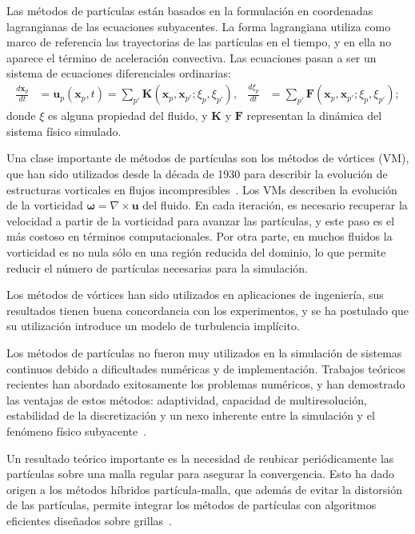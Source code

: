 \documentclass[11pt,spanish]{article}
\newcommand{\vel}{\mathbf{u}}
\newcommand{\vort}{\mathbf{\omega}}
\newcommand{\pos}{\mathbf{x}}
\begin{document}
Las métodos de partículas están basados en la formulación en coordenadas
lagrangianas de las ecuaciones subyacentes.  La forma lagrangiana utiliza como
marco de referencia las trayectorias de las partículas en el tiempo, y en ella
no aparece el término de aceleración convectiva.  Las ecuaciones pasan a ser un
sistema de ecuaciones diferenciales ordinarias:
\begin{align}
    \frac{d\pos_p}{dt} &= \vel_p(\pos_p, t) =
        \sum_{p'} \mathbf{K}(\pos_p, \pos_{p'}; \xi_p, \xi_{p'}), &
    \frac{d\xi_p}{dt} &=
        \sum_{p'} \mathbf{F}(\pos_p, \pos_{p'}; \xi_p, \xi_{p'});
\end{align}
donde $\xi$ es alguna propiedad del fluido, y $\mathbf{K}$ y $\mathbf{F}$ 
representan la dinámica del sistema físico simulado.

Una clase importante de métodos de partículas son los métodos de vórtices (VM),
que han sido utilizados desde la década de 1930 para describir la evolución de
estructuras vorticales en flujos incompresibles~\cite[\S2.2]{multiscale}.  Los
VMs describen la evolución de la vorticidad $\vort = \nabla\times\vel$ del
fluido.  En cada iteración, es necesario recuperar la velocidad a partir de la
vorticidad para avanzar las partículas, y este paso es el más costoso en
términos computacionales.  Por otra parte, en muchos fluidos la vorticidad es
no nula sólo en una región reducida del dominio, lo que permite reducir el
número de partículas necesarias para la simulación.

Los métodos de vórtices han sido utilizados en aplicaciones de ingeniería,
sus resultados tienen buena concordancia con los experimentos, y se ha postulado
que su utilización introduce un modelo de turbulencia implícito.

Los métodos de partículas no fueron muy utilizados en la simulación de sistemas
continuos debido a dificultades numéricas y de implementación.  Trabajos
teóricos recientes han abordado exitosamente los problemas numéricos, y han
demostrado las ventajas de estos métodos:  adaptividad, capacidad de
multiresolución, estabilidad de la discretización y un nexo inherente entre
la simulación y el fenómeno físico subyacente~\cite{ppm}.

Un resultado teórico importante es la necesidad de reubicar periódicamente
las partículas sobre una malla regular para asegurar la convergencia.  Esto ha
dado origen a los métodos híbridos partícula-malla, que además de evitar la
distorsión de las partículas, permite integrar los métodos de partículas con
algoritmos eficientes diseñados sobre grillas~\cite[\S3]{multiscale}.
\end{document}

